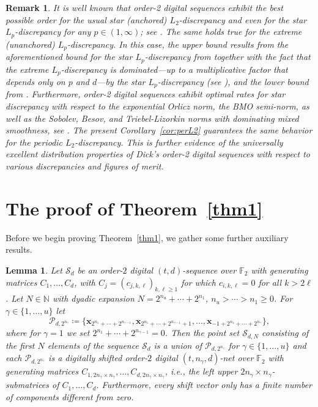 \documentclass[12pt, a4paper]{article}
\newtheorem{lem}[thm]{Lemma}
\newtheorem{rem}[thm]{Remark}
\def\P{\mathcal{P}}
\def\S{\mathcal{S}}
\newcommand{\N}{{\mathbb{N}}} %
\begin{document}
\begin{rem}\rm
It is well known that order-2 digital sequences exhibit the best possible order for the usual star (anchored) $L_2$-discrepancy and even for the star $L_p$-discrepancy for any $p \in (1,\infty)$; see \cite{DHMP16}. The same holds true for the extreme (unanchored) $L_p$-discrepancy. In this case, the upper bound results from the aforementioned bound for the star $L_p$-discrepancy from \cite{DHMP16} together with the fact that the extreme $L_p$-discrepancy is dominated---up to a multiplicative factor that depends only on $p$ and $d$---by the star $L_p$-discrepancy (see \cite[Corollary~5]{KP22b}), and the lower bound from \cite[Theorem~1]{KP22a}. Furthermore, order-2 digital sequences exhibit optimal rates for star discrepancy with respect to the exponential Orlicz norm, 
the BMO semi-norm, as well as the Sobolev, Besov, and Triebel-Lizorkin norms with dominating mixed smoothness, see \cite[Theorems~2.1, 2.2, 3.1 and 3.2]{DHMP}. The present Corollary~\ref{cor:perL2} guarantees the same behavior for the periodic $L_2$-discrepancy. This is further evidence of the universally excellent distribution properties of Dick's order-2 digital sequences with respect to various discrepancies and figures of merit.
\end{rem}

\section{The proof of Theorem~\ref{thm1}}\label{sec:proof}

Before we begin proving Theorem~\ref{thm1}, we gather some further auxiliary results.

\begin{lem}\label{le:partS}
Let $\S_d$ be an order-$2$ digital $(t,d)$-sequence over $\mathbb{F}_2$ with generating matrices $C_1,\ldots,C_d$, with $C_j = (c_{j,k,\ell})_{k, \ell \ge 1}$ for which $c_{i,k,\ell} = 0$ for all $k > 2 \ell$. Let $N \in \N$ with dyadic expansion $N=2^{n_u}+\cdots+2^{n_1}$, $n_u>\cdots>n_1\geq 0$. For $\gamma \in \{1, \ldots, u\}$ let
\begin{equation*}
\P_{d,2^{n_\gamma}} \coloneqq \{\boldsymbol{x}_{2^{n_1}+\cdots + 2^{n_{\gamma-1}}}, \boldsymbol{x}_{2^{n_1}+\cdots + 2^{n_{\gamma-1}} + 1}, \ldots, \boldsymbol{x}_{-1+2^{n_1} + \cdots + 2^{n_\gamma}}\},
\end{equation*}
where for $\gamma = 1$ we set $2^{n_1} + \cdots + 2^{n_{\gamma-1}} = 0$. Then the point set $\S_{d,N}$ consisting of the first $N$ elements of the sequence $\S_d$ is a union of $\P_{d,2^{n_\gamma}}$ for $\gamma \in \{1, \ldots, u\}$ and each $\P_{d,2^{n_\gamma}}$ is a digitally shifted order-$2$ digital $(t,n_\gamma,d)$-net over $\mathbb{F}_2$ with generating matrices $C_{1,2 n_\gamma \times n_\gamma},\ldots,C_{d,2 n_\gamma \times n_\gamma}$, i.e., the left upper $2 n_\gamma \times n_\gamma$-submatrices of $C_1,\ldots,C_d$. Furthermore, every shift vector only has a finite number of components different from zero.     
\end{lem}
\end{document}
